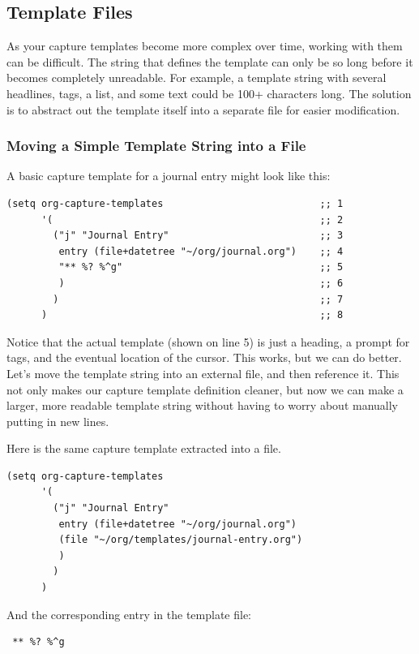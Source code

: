 \documentclass[11pt]{article}
\begin{document}
\subsection*{Template Files}
\label{sec:org82fffdd}
As your capture templates become more complex over time, working with them can be difficult. The string that defines the template can only be so long before it becomes completely unreadable. For example, a template string with several headlines, tags, a list, and some text could be 100+ characters long. The solution is to abstract out the template itself into a separate file for easier modification.
\subsubsection*{Moving a Simple Template String into a File}
\label{sec:orgde0b0d0}
A basic capture template for a journal entry might look like this:

\begin{verbatim}
(setq org-capture-templates                           ;; 1
      '(                                              ;; 2
        ("j" "Journal Entry"                          ;; 3
         entry (file+datetree "~/org/journal.org")    ;; 4
         "** %? %^g"                                  ;; 5
         )                                            ;; 6
        )                                             ;; 7
      )                                               ;; 8
\end{verbatim}

Notice that the actual template (shown on line 5) is just a heading, a prompt for tags, and the eventual location of the cursor. This works, but we can do better. Let's move the template string into an external file, and then reference it. This not only makes our capture template definition cleaner, but now we can make a larger, more readable template string without having to worry about manually putting in new lines.

Here is the same capture template extracted into a file.

\begin{verbatim}
(setq org-capture-templates
      '(
        ("j" "Journal Entry"
         entry (file+datetree "~/org/journal.org")
         (file "~/org/templates/journal-entry.org")
         )
        )
      )
\end{verbatim}

And the corresponding entry in the template file:

\begin{verbatim}
 ** %? %^g
\end{verbatim}
\end{document}
